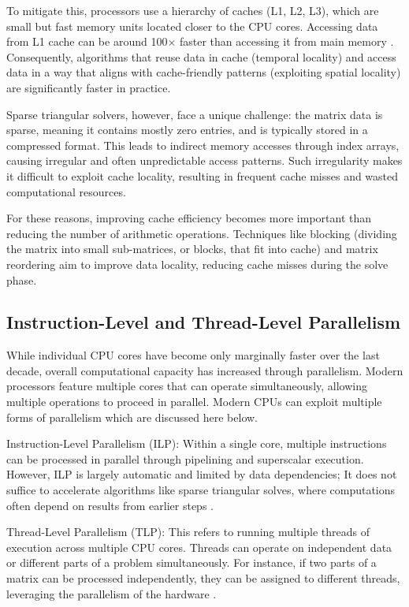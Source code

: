 To mitigate this, processors use a hierarchy of caches (L1, L2, L3), which are small but fast memory units located closer to the CPU cores. Accessing data from L1 cache can be around 100× faster than accessing it from main memory \cite{levinthal2010performance}. Consequently, algorithms that reuse data in cache (temporal locality) and access data in a way that aligns with cache-friendly patterns (exploiting spatial locality) are significantly faster in practice.

Sparse triangular solvers, however, face a unique challenge: the matrix data is sparse, meaning it contains mostly zero entries, and is typically stored in a compressed format. This leads to indirect memory accesses through index arrays, causing irregular and often unpredictable access patterns. Such irregularity makes it difficult to exploit cache locality, resulting in frequent cache misses and wasted computational resources.

For these reasons, improving cache efficiency becomes more important than reducing the number of arithmetic operations. Techniques like blocking (dividing the matrix into small sub-matrices, or blocks, that fit into cache) and matrix reordering aim to improve data locality, reducing cache misses during the solve phase.

\subsection{Instruction-Level and Thread-Level Parallelism}
While individual CPU cores have become only marginally faster over the last decade, overall computational capacity has increased through parallelism. Modern processors feature multiple cores that can operate simultaneously, allowing multiple operations to proceed in parallel. Modern CPUs can exploit multiple forms of parallelism which are discussed here below.

Instruction-Level Parallelism (ILP): Within a single core, multiple instructions can be processed in parallel through pipelining and superscalar execution. However, ILP is largely automatic and limited by data dependencies; It does not suffice to accelerate algorithms like sparse triangular solves, where computations often depend on results from earlier steps \cite{rauber2023parallel}.

Thread-Level Parallelism (TLP): This refers to running multiple threads of execution across multiple CPU cores. Threads can operate on independent data or different parts of a problem simultaneously. For instance, if two parts of a matrix can be processed independently, they can be assigned to different threads, leveraging the parallelism of the hardware \cite{rauber2023parallel}.

